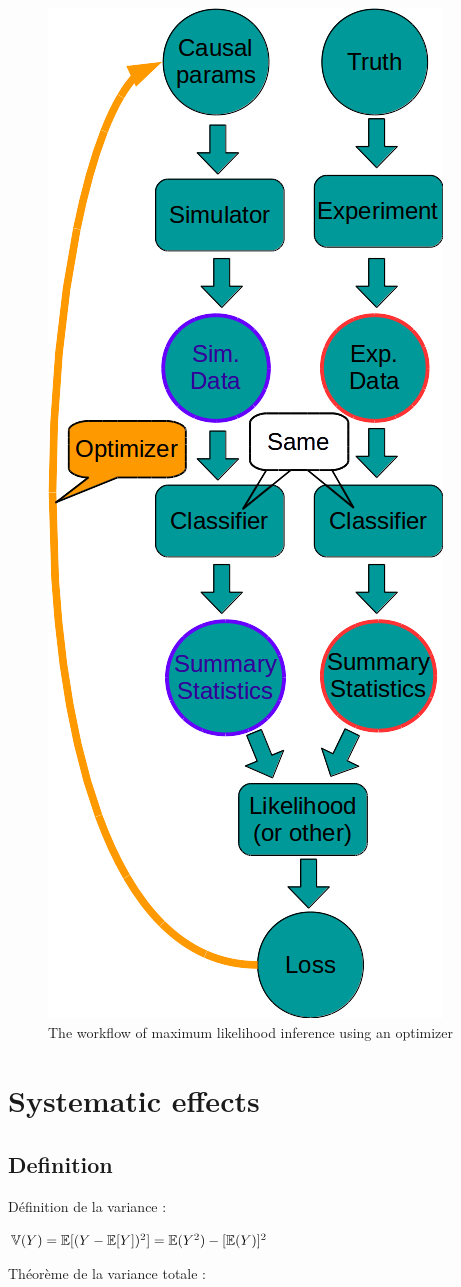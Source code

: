 \begin{figure}[htb]
    \centering
    \includegraphics[width=0.3\linewidth]{workflow}
    \caption{The workflow of maximum likelihood inference using an optimizer}
    \label{fig:workflow}
\end{figure}











\section{Systematic effects} %
\label{sec:systematic_effects}






\subsection{Definition} %
\label{sub:definition}


Définition de la variance :

$\mathbb{V}(Y) = \mathbb{E}[(Y - \mathbb{E}[Y])^2] = \mathbb{E}(Y^2) - [\mathbb{E}(Y)]^2$

Théorème de la variance totale \needcite :

